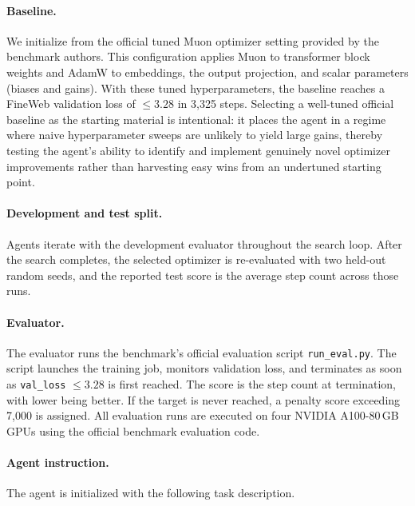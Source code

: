 \paragraph{Baseline.}
We initialize from the official tuned Muon optimizer setting provided by the
benchmark authors.
This configuration applies Muon to transformer block weights and AdamW to
embeddings, the output projection, and scalar parameters (biases and gains).
With these tuned hyperparameters, the baseline reaches a FineWeb validation
loss of $\leq 3.28$ in 3{,}325 steps.
Selecting a well-tuned official baseline as the starting material is
intentional: it places the agent in a regime where naive hyperparameter
sweeps are unlikely to yield large gains, thereby testing the agent's ability
to identify and implement genuinely novel optimizer improvements rather than
harvesting easy wins from an undertuned starting point.

\paragraph{Development and test split.}
Agents iterate with the development evaluator throughout the search loop.
After the search completes, the selected optimizer is re-evaluated with two
held-out random seeds, and the reported test score is the average step count
across those runs.

\paragraph{Evaluator.}
The evaluator runs the benchmark's official evaluation script
\texttt{run\_eval.py}.
The script launches the training job, monitors validation loss, and
terminates as soon as \texttt{val\_loss} $\leq 3.28$ is first reached.
The score is the step count at termination, with lower being better.
If the target is never reached, a penalty score exceeding 7{,}000 is
assigned.
All evaluation runs are executed on four NVIDIA A100-80\,GB GPUs using the
official benchmark evaluation code.

\paragraph{Agent instruction.}
The agent is initialized with the following task description.

